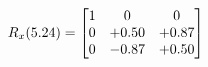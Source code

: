 \documentclass[preview]{standalone}
\begin{document}
\begin{align*}
\special{dvisvgm:raw <g id='unique000'>}R_{x}(5.24) = \begin{bmatrix}1 & 0 & 0 \\0 & +0.50 & +0.87 \\0 & -0.87 & +0.50\end{bmatrix}\special{dvisvgm:raw </g>}
\end{align*}
\end{document}
